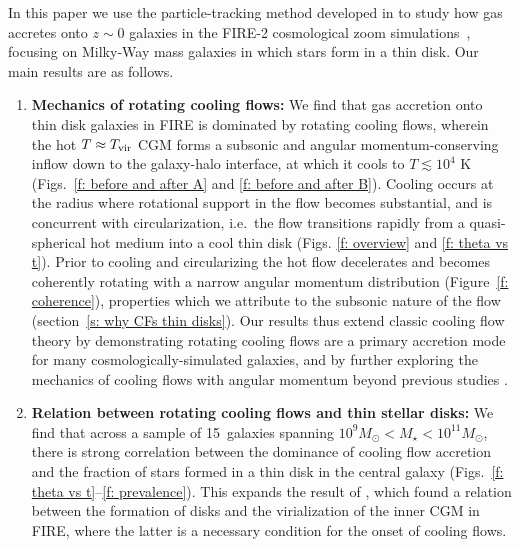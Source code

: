 \documentclass[fleqn,usenatbib]{mnras}
\newcommand{\Nsample}{15}
\begin{document}
In this paper we use the particle-tracking method developed in \cite{Hafen2019,Hafen2020} to study how gas accretes onto $z\sim0$ galaxies in the FIRE-2 cosmological zoom simulations~\citep{Hopkins2018}, focusing on Milky-Way mass galaxies in which stars form in a thin disk. 
Our main results are as follows.
\begin{enumerate}
    \item \textbf{Mechanics of rotating cooling flows:}
    We find that gas accretion onto thin disk galaxies in FIRE is dominated by rotating cooling flows, wherein the hot $T\approx T_{\rm vir}$ CGM forms a subsonic and angular momentum-conserving inflow down to the galaxy-halo interface, at which it cools to $T\lesssim10^4$ K (Figs.~\ref{f: before and after A} and \ref{f: before and after B}).
    Cooling occurs at the radius where rotational support in the flow becomes substantial, and is concurrent with circularization, i.e.~the flow transitions rapidly from a quasi-spherical hot medium into a cool thin disk (Figs. \ref{f: overview} and \ref{f: theta vs t}).
    Prior to cooling and circularizing the hot flow decelerates and becomes coherently rotating with a narrow angular momentum distribution (Figure~\ref{f: coherence}), properties which we attribute to the subsonic nature of the flow (section~\ref{s: why CFs thin disks}).
    Our results thus extend classic cooling flow theory by demonstrating rotating cooling flows are a primary accretion mode for many cosmologically-simulated galaxies, and by further exploring the mechanics of cooling flows with angular momentum beyond previous studies \citep{Cowie1980, Stern2019}. 
    \item \textbf{Relation between rotating cooling flows and thin stellar disks:}
    We find that across a sample of \Nsample~galaxies spanning $10^9 M_\odot < M_\star < 10^{11} M_\odot$, there is strong correlation between the dominance of cooling flow accretion and the fraction of stars formed in a thin disk in the central galaxy (Figs.~\ref{f: theta vs t}--\ref{f: prevalence}).
    This expands the result of \cite{Stern2021}, which found a relation between the formation of disks and the virialization of the inner CGM in FIRE, where the latter is a necessary condition for the onset of cooling flows. 

\end{enumerate}
\end{document}
